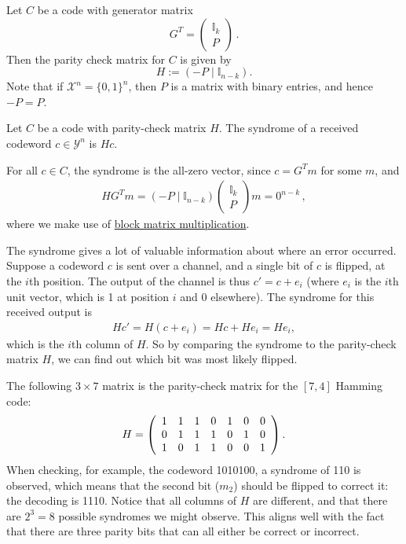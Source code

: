 \begin{definition}
Let $C$ be a code with generator matrix 
\[G^T = \left(\begin{array}{c}
\mathbb{I}_k\\\hline P
\end{array}\right) \, .\] 
 Then the parity check matrix for $C$ is given by
\[
H := \left( - P \mid \mathbb{I}_{n-k}\right).
\]
Note that if $\mathcal{X}^n = \{0,1\}^n$, then $P$ is a matrix with binary entries, and hence $-P = P$.
\end{definition}

\begin{definition}[Syndrome]
Let $C$ be a code with parity-check matrix $H$. The syndrome of a received codeword $c \in \mathcal{Y}^n$ is $Hc$.
\end{definition}
For all $c \in C$, the syndrome is the all-zero vector, since $c = G^Tm$ for some $m$, and 
\begin{align}
HG^Tm = \left(-P\mid \mathbb{I}_{n-k}\right)\left(\begin{array}{c} \mathbb{I}_{k} \\\hline P \end{array}\right) m = 0^{n-k} \, ,
\end{align}
where we make use of \href{https://en.wikipedia.org/wiki/Block_matrix}{block matrix multiplication}.

The syndrome gives a lot of valuable information about where an error occurred. Suppose a codeword $c$ is sent over a channel, and a single bit of $c$ is flipped, at the $i$th position. The output of the channel is thus $c' = c + e_i$ (where $e_i$ is the $i$th unit vector, which is 1 at position $i$ and 0 elsewhere). The syndrome for this received output is
\begin{align}
Hc' = H(c + e_i) = Hc + He_i = He_i,
\end{align}
which is the $i$th column of $H$. So by comparing the syndrome to the parity-check matrix $H$, we can find out which bit was most likely flipped.

\begin{example}
The following $3 \times 7$ matrix is the parity-check matrix for the $[7,4]$ Hamming code:
\[
H = \left(\begin{array}{c c c c c c c}
1 & 1 & 1 & 0 & 1 & 0 & 0\\
0 & 1 & 1 & 1 & 0 & 1 & 0\\
1 & 0 & 1 & 1 & 0 & 0 & 1\\
\end{array}
\right).
\]
When checking, for example, the codeword 1010100, a syndrome of 110 is observed, which means that the second bit ($m_2$) should be flipped to correct it: the decoding is 1110.
Notice that all columns of $H$ are different, and that there are $2^3 = 8$ possible syndromes we might observe. This aligns well with the fact that there are three parity bits that can all either be correct or incorrect.
\end{example}


